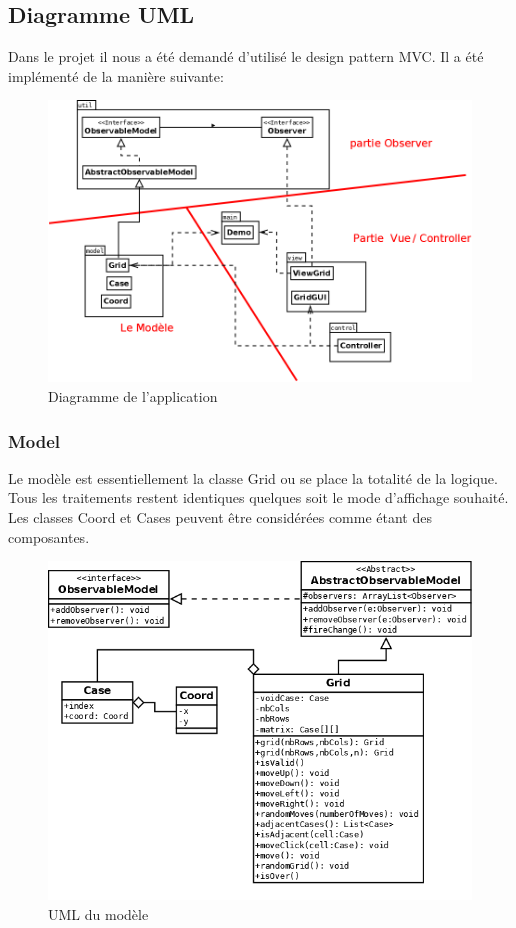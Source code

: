 \documentclass[12pt]{article}
\begin{document}
\subsection{Diagramme UML}
Dans le projet il nous a été demandé d'utilisé le design pattern MVC. Il a été implémenté de la manière suivante:
\begin{figure}[ht!]
	\begin{center}
		\includegraphics[width=1\textwidth]{puzz.png}
	\end{center}
	\caption{Diagramme de l'application}
	\label{DA}
\end{figure}
\newpage
\subsubsection{Model}
Le modèle est essentiellement la classe Grid ou se place la totalité de la logique. Tous
les traitements restent identiques quelques soit le mode d'affichage souhaité. Les classes Coord et Cases peuvent être considérées comme étant des composantes.
\begin{figure}[h!]
	\begin{center}
		\includegraphics[width=1\textwidth]{model_puzzle.png}
	\end{center}
	\caption{UML du modèle}
	\label{model}
\end{figure}	
\end{document}
